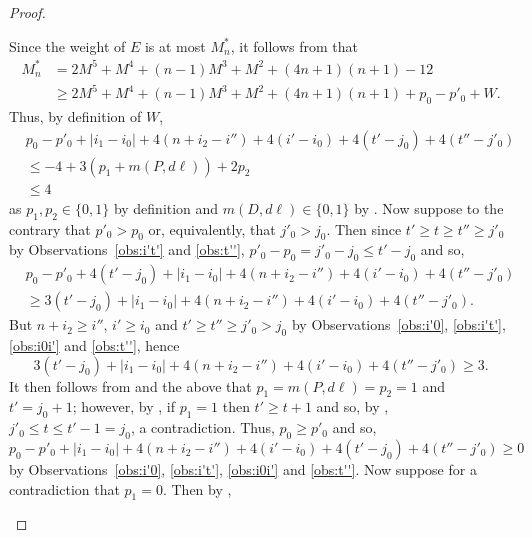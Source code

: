 \begin{proof}
\begin{claimproof}
Since the weight of $E$ is at most $M_n^*$, it follows from  that
\begin{equation*}
\begin{split} 
M_n^* & = 2M^5 + M^4 + (n-1)M^3 + M^2 + (4n+1)(n+1) - 12\\
& \geq 2M^5 + M^4 + (n-1)M^3 + M^2 + (4n+1)(n+1) + p_0-p'_0 + W.
\end{split}
\end{equation*}
Thus, by definition of $W$,
\begin{equation}
\label{eq:upperbound}
\begin{split}
& p_0 - p'_0 + |i_1-i_0| + 4(n+i_2-i'') + 4(i'-i_0) + 4(t'-j_0) + 4(t''-j'_0)\\
&\leq -4 + 3(p_1 + m(P,d\ell)) + 2p_2 \\
& \leq 4
\end{split}
\end{equation}
\noindent
as $p_1,p_2 \in \{0,1\}$ by definition and $m(D,d\ell) \in \{0,1\}$ by . Now suppose to the contrary that $p'_0 > p_0$ or, equivalently, that $j'_0 > j_0$. Then since $t' \geq t \geq t'' \geq j'_0$ by Observations~\ref{obs:i't'} and \ref{obs:t''}, $p'_0 - p_0 = j'_0 - j_0 \leq t' - j_0$ and so,
\begin{equation*}
\begin{split}
& p_0 - p'_0 + 4(t'-j_0) + |i_1-i_0| + 4(n+i_2-i'') + 4(i'-i_0)+ 4(t''-j'_0)\\
&\geq 3(t'-j_0) + |i_1-i_0| + 4(n+i_2-i'') + 4(i'-i_0) + 4(t''-j'_0).
\end{split}
\end{equation*} 
But $n+i_2 \geq i''$, $i' \geq i_0$ and $t' \geq t'' \geq j'_0 > j_0$ by Observations~\ref{obs:i'0}, \ref{obs:i't'}, \ref{obs:i0i'} and \ref{obs:t''}, hence
\begin{equation*}
3(t'-j_0) + |i_1-i_0| + 4(n+i_2-i'') + 4(i'-i_0) + 4(t''-j'_0) \geq 3.
\end{equation*} 
It then follows from  and the above that $p_1 = m(P,d\ell) = p_2=1$ and $t' = j_0 + 1$; however, by , if $p_1 = 1$ then $t' \geq t+1$ and so, by , $j'_0 \leq t \leq t'-1 = j_0$, a contradiction. Thus, $p_0 \geq p'_0$ and so,
\begin{equation}
\label{eq:positif}
 p_0 - p'_0 + |i_1-i_0| + 4(n+i_2-i'') + 4(i'-i_0) + 4(t'-j_0) + 4(t''-j'_0) \geq 0
\end{equation}
\noindent 
by Observations~\ref{obs:i'0}, \ref{obs:i't'}, \ref{obs:i0i'}  and \ref{obs:t''}. Now suppose for a contradiction that $p_1=0$. Then by ,

\end{claimproof}
\end{proof}
